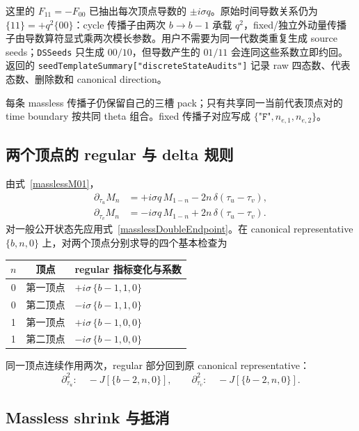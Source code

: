 ﻿\documentclass[a4paper,11pt]{article}
\begin{document}
这里的 $F_{11}=-F_{00}$ 已抽出每次顶点导数的 $\pm i\sigma q$。原始时间导数关系仍为 $\{11\}=+q^2\{00\}$：cycle 传播子由两次 $b\to b-1$ 承载 $q^2$，fixed/独立外动量传播子由导数算符显式乘两次模长参数。用户不需要为同一代数类重复生成 source seeds；\texttt{DSSeeds} 只生成 $00/10$，但导数产生的 $01/11$ 会连同这些系数立即约回。返回的 \texttt{seedTemplateSummary["discreteStateAudits"]} 记录 raw 四态数、代表态数、删除数和 canonical direction。

每条 massless 传播子仍保留自己的三槽 pack；只有共享同一当前代表顶点对的 time boundary 按共同 theta 组合。fixed 传播子对应写成 $\{\texttt{"F"},n_{e,1},n_{e,2}\}$。

\subsection{两个顶点的 regular 与 delta 规则}

由式~\eqref{masslessM01}，
\begin{align}
 \partial_{\tau_u}M_n
 &=+i\sigma q\,M_{1-n}
   -2n\,\delta(\tau_u-\tau_v),\\
 \partial_{\tau_v}M_n
 &=-i\sigma q\,M_{1-n}
   +2n\,\delta(\tau_u-\tau_v).
 \label{masslessTimeRules}
\end{align}
对一般公开状态先应用式~\eqref{masslessDoubleEndpoint}。在 canonical representative $\{b,n,0\}$ 上，对两个顶点分别求导的四个基本检查为
\begin{center}
\begin{tabular}{ccl}
\toprule
$n$ & 顶点 & regular 指标变化与系数\\
\midrule
0 & 第一顶点 & $+i\sigma\,\{b-1,1,0\}$\\
0 & 第二顶点 & $-i\sigma\,\{b-1,1,0\}$\\
1 & 第一顶点 & $+i\sigma\,\{b-1,0,0\}$\\
1 & 第二顶点 & $-i\sigma\,\{b-1,0,0\}$\\
\bottomrule
\end{tabular}
\end{center}
同一顶点连续作用两次，regular 部分回到原 canonical representative：
\begin{equation}
 \partial_{\tau_u}^2:\quad
 -J[\{b-2,n,0\}],
 \qquad
 \partial_{\tau_v}^2:\quad
 -J[\{b-2,n,0\}].
\end{equation}

\subsection{Massless shrink 与抵消}
\end{document}
